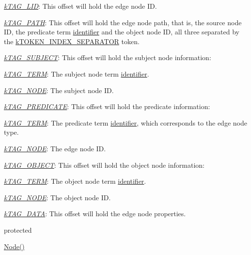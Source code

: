 \begin{DoxyItemize}
\item {\itshape \hyperlink{}{k\-T\-A\-G\-\_\-\-L\-I\-D}}\-: This offset will hold the edge node I\-D. 
\item {\itshape \hyperlink{}{k\-T\-A\-G\-\_\-\-P\-A\-T\-H}}\-: This offset will hold the edge node path, that is, the source node I\-D, the predicate term \hyperlink{}{identifier} and the object node I\-D, all three separated by the \hyperlink{}{k\-T\-O\-K\-E\-N\-\_\-\-I\-N\-D\-E\-X\-\_\-\-S\-E\-P\-A\-R\-A\-T\-O\-R} token. 
\item {\itshape \hyperlink{}{k\-T\-A\-G\-\_\-\-S\-U\-B\-J\-E\-C\-T}}\-: This offset will hold the subject node information\-: 
\begin{DoxyItemize}
\item {\itshape \hyperlink{}{k\-T\-A\-G\-\_\-\-T\-E\-R\-M}}\-: The subject node term \hyperlink{}{identifier}. 
\item {\itshape \hyperlink{}{k\-T\-A\-G\-\_\-\-N\-O\-D\-E}}\-: The subject node I\-D. 
\end{DoxyItemize}
\item {\itshape \hyperlink{}{k\-T\-A\-G\-\_\-\-P\-R\-E\-D\-I\-C\-A\-T\-E}}\-: This offset will hold the predicate information\-: 
\begin{DoxyItemize}
\item {\itshape \hyperlink{}{k\-T\-A\-G\-\_\-\-T\-E\-R\-M}}\-: The predicate term \hyperlink{}{identifier}, which corresponds to the edge node type. 
\item {\itshape \hyperlink{}{k\-T\-A\-G\-\_\-\-N\-O\-D\-E}}\-: The edge node I\-D. 
\end{DoxyItemize}
\item {\itshape \hyperlink{}{k\-T\-A\-G\-\_\-\-O\-B\-J\-E\-C\-T}}\-: This offset will hold the object node information\-: 
\begin{DoxyItemize}
\item {\itshape \hyperlink{}{k\-T\-A\-G\-\_\-\-T\-E\-R\-M}}\-: The object node term \hyperlink{}{identifier}. 
\item {\itshape \hyperlink{}{k\-T\-A\-G\-\_\-\-N\-O\-D\-E}}\-: The object node I\-D. 
\end{DoxyItemize}
\item {\itshape \hyperlink{}{k\-T\-A\-G\-\_\-\-D\-A\-T\-A}}\-: This offset will hold the edge node properties. 
\end{DoxyItemize}

protected

\hyperlink{class_c_ontology_edge_index_aef9939a536194ce9b30e10482680eca1}{Node()} 

